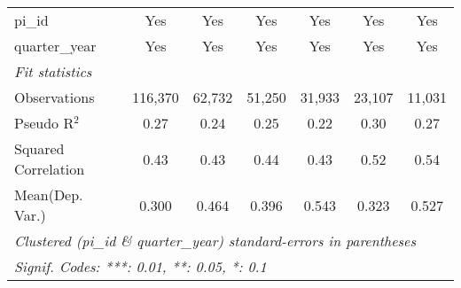 \begin{tabular}{lcccccc}
   pi\_id                                                     & Yes           & Yes           & Yes            & Yes           & Yes           & Yes\\  
   quarter\_year                                              & Yes           & Yes           & Yes            & Yes           & Yes           & Yes\\  
   \midrule
   \emph{Fit statistics}\\
   Observations                                               & 116,370       & 62,732        & 51,250         & 31,933        & 23,107        & 11,031\\  
   Pseudo R$^2$                                               & 0.27          & 0.24          & 0.25           & 0.22          & 0.30          & 0.27\\  
   Squared Correlation                                        & 0.43          & 0.43          & 0.44           & 0.43          & 0.52          & 0.54\\  
Mean(Dep. Var.) & 0.300 & 0.464 & 0.396 & 0.543 & 0.323 & 0.527 \\
   \midrule \midrule
   \multicolumn{7}{l}{\emph{Clustered (pi\_id \& quarter\_year) standard-errors in parentheses}}\\
   \multicolumn{7}{l}{\emph{Signif. Codes: ***: 0.01, **: 0.05, *: 0.1}}\\
\end{tabular}
\par\endgroup
